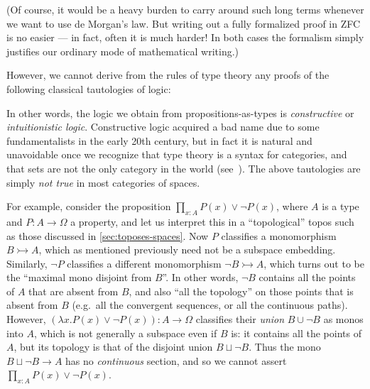\documentclass[12pt]{article}
\numberwithin{equation}{section}
\begin{document}
(Of course, it would be a heavy burden to carry around such long terms whenever we want to use de Morgan's law.
But writing out a fully formalized proof in ZFC is no easier --- in fact, often it is much harder!
In both cases the formalism simply justifies our ordinary mode of mathematical writing.)

However, we cannot derive from the rules of type theory any proofs of the following classical tautologies of logic:
In other words, the logic we obtain from propositions-as-types is \emph{constructive} or \emph{intuitionistic logic}.
Constructive logic acquired a bad name due to some fundamentalists in the early 20th century, but in fact it is natural and unavoidable once we recognize that type theory is a syntax for categories, and that sets are not the only category in the world (see~\cite{bauer:5stages}).
The above tautologies are simply \emph{not true} in most categories of spaces. %

For example, consider the proposition $\prod_{x:A} P(x) \lor \neg P(x)$, where $A$ is a type and $P:A\to\Omega$ a property, and let us interpret this in a ``topological'' topos such as those discussed in \cref{sec:toposes-spaces}.
Now $P$ classifies a monomorphism $B\rightarrowtail A$, which as mentioned previously need not be a subspace embedding.
Similarly, $\neg P$ classifies a different monomorphism $\neg B\rightarrowtail A$, which turns out to be the ``maximal mono disjoint from $B$''.
In other words, $\neg B$ contains all the points of $A$ that are absent from $B$, and also ``all the topology'' on those points that is absent from $B$ (e.g.\ all the convergent sequences, or all the continuous paths).
However, $(\lambda x. P(x)\lor \neg P(x)) : A \to \Omega$ classifies their \emph{union} $B\cup \neg B$ as monos into $A$, which is not generally a subspace even if $B$ is: it contains all the points of $A$, but its topology is that of the disjoint union $B \sqcup \neg B$.
Thus the mono $B\sqcup \neg B \to A$ has no \emph{continuous} section, and so we cannot assert $\prod_{x:A} P(x) \lor \neg P(x)$.
\end{document}

